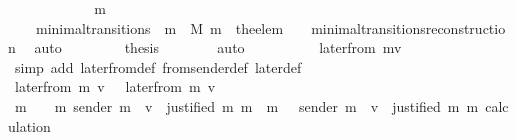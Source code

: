 \begin{isabellebody}
\ {\isacharminus}\isanewline
\ \ \ \ \isamarkupfalse%
\ {\isachardoublequoteopen}{\isasymsigma}{\isacharprime}\ {\isacharequal}\ \ {\isasymsigma}\ {\isasymunion}\ {\isacharbraceleft}m{\isacharprime}{\isacharbraceright}{\isachardoublequoteclose}\isanewline
\ \ \ \ \ \ \isamarkupfalse%
\ {\isacartoucheopen}{\isacharparenleft}{\isasymsigma}{\isacharcomma}\ {\isasymsigma}{\isacharprime}{\isacharparenright}\ {\isasymin}\ minimal{\isacharunderscore}transitions\ {\isasymand}\ m\ {\isasymin}\ M{\isacartoucheclose}\ {\isacartoucheopen}m{\isacharprime}\ {\isacharequal}\ the{\isacharunderscore}elem\ {\isacharparenleft}{\isasymsigma}{\isacharprime}\ {\isacharminus}\ {\isasymsigma}{\isacharparenright}{\isacartoucheclose}\ minimal{\isacharunderscore}transitions{\isacharunderscore}reconstruction\ \isamarkupfalse%
\ auto\ \isanewline
\ \ \ \ \isamarkupfalse%
\ \isamarkupfalse%
\ {\isacharquery}thesis\isanewline
\ \ \ \ \ \ \isamarkupfalse%
\ auto\isanewline
\ \ \isamarkupfalse%
\isanewline
\ \ \isamarkupfalse%
\ \isamarkupfalse%
\ {\isachardoublequoteopen}{\isasymdots}\ {\isacharequal}\ later{\isacharunderscore}from\ {\isacharparenleft}m{\isacharcomma}v{\isacharcomma}{\isasymsigma}{\isacharprime}{\isacharparenright}{\isachardoublequoteclose}\isanewline
\ \ \ \ \isamarkupfalse%
\ {\isacharparenleft}simp\ add{\isacharcolon}\ later{\isacharunderscore}from{\isacharunderscore}def\ from{\isacharunderscore}sender{\isacharunderscore}def\ later{\isacharunderscore}def{\isacharparenright}\isanewline
\ \ \isamarkupfalse%
\ \isamarkupfalse%
\ {\isachardoublequoteopen}later{\isacharunderscore}from\ {\isacharparenleft}m{\isacharcomma}\ v{\isacharcomma}\ {\isasymsigma}{\isacharparenright}\ {\isacharequal}\ later{\isacharunderscore}from\ {\isacharparenleft}m{\isacharcomma}\ v{\isacharcomma}\ {\isasymsigma}{\isacharprime}{\isacharparenright}{\isachardoublequoteclose}\isanewline
\ \ \ \ \isamarkupfalse%
\ {\isacartoucheopen}{\isacharbraceleft}m{\isacharprime}{\isacharprime}\ {\isasymin}\ {\isasymsigma}\ {\isasymunion}\ {\isacharbraceleft}m{\isacharprime}{\isacharbraceright}{\isachardot}\ sender\ m{\isacharprime}{\isacharprime}\ {\isacharequal}\ v\ {\isasymand}\ justified\ m\ m{\isacharprime}{\isacharprime}{\isacharbraceright}\ {\isacharequal}\ {\isacharbraceleft}m{\isacharprime}{\isacharprime}\ {\isasymin}\ {\isasymsigma}{\isacharprime}{\isachardot}\ sender\ m{\isacharprime}{\isacharprime}\ {\isacharequal}\ v\ {\isasymand}\ justified\ m\ m{\isacharprime}{\isacharprime}{\isacharbraceright}{\isacartoucheclose}\ calculation\ \isamarkupfalse%

\end{isabellebody}
